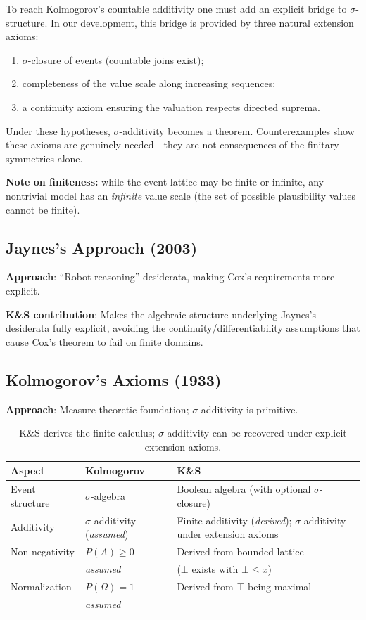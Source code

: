 \documentclass[11pt]{article}
\begin{document}
To reach Kolmogorov's countable additivity one must add an explicit bridge to $\sigma$-structure.
In our development, this bridge is provided by three natural extension axioms:
\begin{enumerate}[noitemsep]
\item $\sigma$-closure of events (countable joins exist);
\item completeness of the value scale along increasing sequences;
\item a continuity axiom ensuring the valuation respects directed suprema.
\end{enumerate}
Under these hypotheses, $\sigma$-additivity becomes a theorem.
Counterexamples show these axioms are genuinely needed---they are not consequences of the finitary symmetries alone.

\textbf{Note on finiteness:} while the event lattice may be finite or infinite, any nontrivial model has an
\emph{infinite} value scale (the set of possible plausibility values cannot be finite).

\subsection{Jaynes's Approach (2003)}

\textbf{Approach}: ``Robot reasoning'' desiderata, making Cox's requirements more explicit.

\textbf{K\&S contribution}: Makes the algebraic structure underlying Jaynes's desiderata fully explicit,
avoiding the continuity/differentiability assumptions that cause Cox's theorem to fail on finite domains.

\subsection{Kolmogorov's Axioms (1933)}

\textbf{Approach}: Measure-theoretic foundation; $\sigma$-additivity is primitive.

\begin{table}[h]
\centering
\small
\begin{tabular}{lll}
\toprule
\textbf{Aspect} & \textbf{Kolmogorov} & \textbf{K\&S} \\
\midrule
Event structure & $\sigma$-algebra & Boolean algebra (with optional $\sigma$-closure) \\[3pt]
Additivity & $\sigma$-additivity (\emph{assumed}) &
Finite additivity (\emph{derived}); $\sigma$-additivity under extension axioms \\[3pt]
Non-negativity & $P(A) \geq 0$ & Derived from bounded lattice \\
               & \emph{assumed} & ($\bot$ exists with $\bot \leq x$) \\[3pt]
Normalization & $P(\Omega) = 1$ & Derived from $\top$ being maximal \\
              & \emph{assumed} & \\
\bottomrule
\end{tabular}
\caption{K\&S derives the finite calculus; $\sigma$-additivity can be recovered under explicit extension axioms.}
\end{table}
\end{document}
